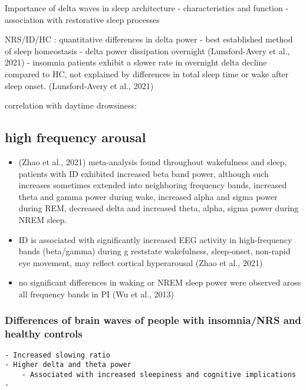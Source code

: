\documentclass[
]{article}
\providecommand{\tightlist}{%
  \setlength{\itemsep}{0pt}\setlength{\parskip}{0pt}}
\begin{document}
Importance of delta waves in sleep architecture - characteristics and
function - association with restorative sleep processes

NRS/ID/HC : quantitative differences in delta power - best established
method of sleep homeostasis - delta power dissipation overnight
(Lunsford-Avery et al., 2021) - insomnia patients exhibit a slower rate
in overnight delta decline compared to HC, not explained by differences
in total sleep time or wake after sleep onset. (Lunsford-Avery et al.,
2021)

correlation with daytime drowsiness:

\subsection{high frequency arousal}\label{high-frequency-arousal}

\begin{itemize}
\tightlist
\item
  (Zhao et al., 2021) meta-analysis found throughout wakefulness and
  sleep, patients with ID exhibited increased beta band power, although
  such increases sometimes extended into neighboring frequency bands,
  increased theta and gamma power during wake, increased alpha and sigma
  power during REM, decreased delta and increased theta, alpha, sigma
  power during NREM sleep.
\item
  ID is associated with significantly increased EEG activity in
  high-frequency bands (beta/gamma) during g reststate wakefulness,
  sleep-onset, non-rapid eye movement, may reflect cortical hyperarousal
  (Zhao et al., 2021)
\item
  no significant differences in waking or NREM sleep power were observed
  aross all frequency bands in PI (Wu et al., 2013)
\end{itemize}

\subsubsection{Differences of brain waves of people with insomnia/NRS
and healthy
controls}\label{differences-of-brain-waves-of-people-with-insomnianrs-and-healthy-controls}

\begin{verbatim}
- Increased slowing ratio
- Higher delta and theta power
    - Associated with increased sleepiness and cognitive implications
- 
\end{verbatim}
\end{document}
